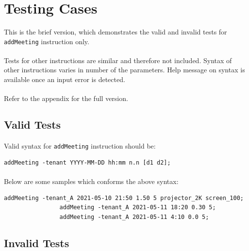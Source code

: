 \documentclass{article}
\begin{document}
    \cleardoublepage
    \section{Testing Cases}
        \paragraph{}
        This is the brief version, which demonstrates the valid and invalid tests for \texttt{addMeeting} instruction only.
        \paragraph{}
        Tests for other instructions are similar and therefore not included. Syntax of other instructions varies in
        number of the parameters. Help message on syntax is available once an input error is detected.
        \paragraph{}
        Refer to the appendix for the full version. 

        \subsection{Valid Tests}
            \paragraph{}
            Valid syntax for \texttt{addMeeting} instruction should be:
            \begin{Verbatim}[gobble=8]
                addMeeting -tenant YYYY-MM-DD hh:mm n.n [d1 d2]; 
            \end{Verbatim}
            \paragraph{}
            Below are some samples which conforms the above syntax:
            \begin{Verbatim}[gobble=8]
                addMeeting -tenant_A 2021-05-10 21:50 1.50 5 projector_2K screen_100;
                addMeeting -tenant_A 2021-05-11 18:20 0.30 5;
                addMeeting -tenant_A 2021-05-11 4:10 0.0 5;
            \end{Verbatim}
        
        
        \subsection{Invalid Tests}
\end{document}
